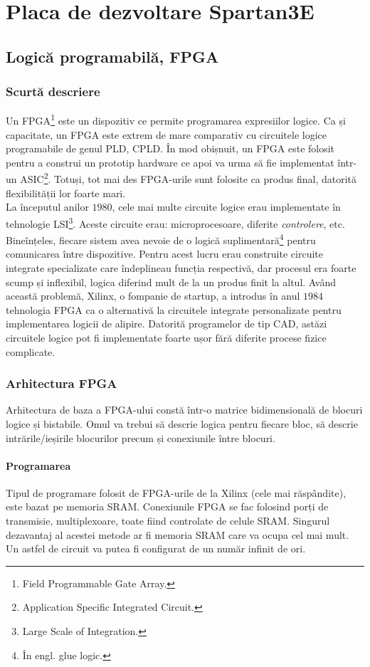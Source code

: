 \documentclass[12pt,twoside,a4paper,fleqn]{book}
\begin{document}
\chapter{Placa de dezvoltare Spartan3E}
\section{Logică programabilă, FPGA}
\subsection{Scurtă descriere}
Un FPGA\footnote{Field Programmable Gate Array.} este un dispozitiv ce permite programarea expresiilor logice. Ca și capacitate, un FPGA este extrem de mare comparativ cu circuitele logice programabile de genul PLD, CPLD. În mod obișnuit, un FPGA este folosit pentru a construi un prototip hardware ce apoi va urma să fie implementat într-un ASIC\footnote{Application Specific Integrated Circuit.}. Totuși, tot mai des FPGA-urile sunt folosite ca produs final, datorită flexibilității lor foarte mari.\\
La începutul anilor $1980$, cele mai multe circuite logice erau implementate în tehnologie LSI\footnote{Large Scale of Integration.}. Aceste circuite erau: microprocesoare, diferite \emph{controlere}, etc. Bineînțeles, fiecare sistem avea nevoie de o logică suplimentară\footnote{În engl. glue logic.} pentru comunicarea între dispozitive. Pentru acest lucru erau construite circuite integrate specializate care îndeplineau funcția respectivă, dar procesul era foarte scump și inflexibil, logica diferind mult de la un produs finit la altul. Având această problemă, Xilinx, o fompanie de startup, a introdus în anul $1984$ tehnologia FPGA ca o alternativă la circuitele integrate personalizate pentru implementarea logicii de alipire. Datorită programelor de tip CAD, astăzi circuitele logice pot fi implementate foarte ușor fără diferite procese fizice complicate. \cite{Synthesis_arithmetic_circuits}\\
\subsection{Arhitectura FPGA}
Arhitectura de baza a FPGA-ului constă într-o matrice bidimensională de blocuri logice și bistabile. Omul va trebui să descrie logica pentru fiecare bloc, să descrie intrările/ieșirile blocurilor precum și conexiunile între blocuri.
\subsubsection{Programarea}
Tipul de programare folosit de FPGA-urile de la Xilinx (cele mai răspândite), este bazat pe memoria SRAM. Conexiunile FPGA se fac folosind porți de transmisie, multiplexoare, toate fiind controlate de celule SRAM. Singurul dezavantaj al acestei metode ar fi memoria SRAM care va ocupa cel mai mult. Un astfel de circuit va putea fi configurat de un număr infinit de ori. \cite{Synthesis_arithmetic_circuits}
\end{document}

